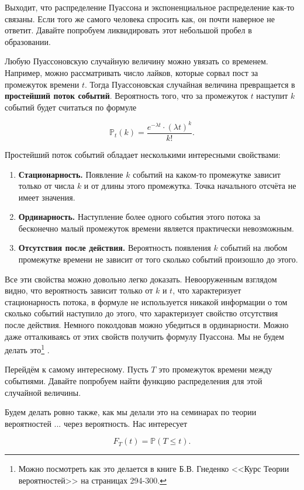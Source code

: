 \documentclass[12pt, a4paper, oneside]{extreport}
\def \mbb{\mathbb}
\def \PP{\mbb{P}}
\newcommand{\indef}[1]{\textbf{#1}}     %
\theoremstyle{plain}              %
\theoremstyle{definition}         %
\begin{document}
Выходит, что распределение Пуассона и экспоненциальное распределение как-то связаны. Если того же самого человека спросить как, он почти наверное не ответит. Давайте попробуем ликвидировать этот небольшой пробел в образовании. 

Любую Пуассоновскую случайную величину можно увязать со временем. Например, можно рассматривать число лайков, которые сорвал пост за промежуток времени $t$. Тогда Пуассоновская случайная величина превращается в \indef{простейший поток событий}.  Вероятность того, что за промежуток $t$ наступит $k$ событий будет считаться по формуле 

\[ \PP_t(k) = \frac{e^{-\lambda t} \cdot (\lambda t)^k}{k!}. \]

Простейший поток событий обладает несколькими интересными свойствами: 

\begin{enumerate}
	\item \indef{Стационарность.} Появление $k$ событий на каком-то промежутке зависит только от числа $k$ и от длины этого промежутка. Точка начального отсчёта не имеет значения. 
	\item \indef{Ординарность.} Наступление более одного события этого потока за бесконечно малый промежуток времени является практически невозможным. 
	\item \indef{Отсутствия после действия.}  Вероятность появления $k$ событий на любом промежутке времени не зависит от того сколько событий произошло до этого. 	
\end{enumerate}

Все эти свойства можно довольно легко доказать. Невооруженным взглядом видно, что вероятность зависит только от $k$ и $t$, что характеризует стационарность потока, в формуле не используется никакой информации о том сколько событий наступило до этого, что характеризует свойство отсутствия после действия. Немного поколдовав можно убедиться в ординарности. Можно даже отталкиваясь от этих свойств получить формулу Пуассона.  Мы не будем делать это\footnote{Можно посмотреть как это делается в книге Б.В. Гнеденко <<Курс Теории вероятностей>> на страницах 294-300.} . 

Перейдём к самому интересному. Пусть $T$ это промежуток времени между событиями. Давайте попробуем найти функцию распределения для этой случайной величины. 

Будем делать ровно также, как мы делали это на семинарах по теории вероятностей ... через вероятность. Нас интересует 

\[ F_T(t) = \PP(T \le t).\]
\end{document}
